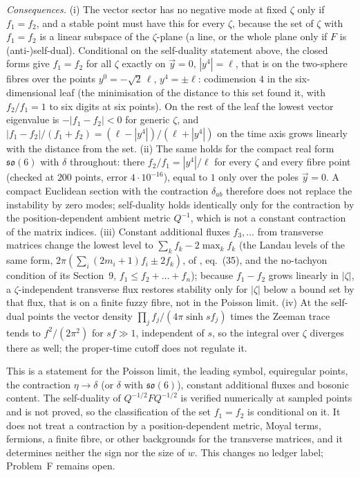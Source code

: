 \emph{Consequences.} (i) The vector sector has no negative mode at fixed \(\zeta\) only if \(f_1=f_2\), and a stable point must have this for every \(\zeta\), because the set of \(\zeta\) with \(f_1=f_2\) is a linear subspace of the \(\zeta\)-plane (a line, or the whole plane only if \(F\) is (anti-)self-dual). Conditional on the self-duality statement above, the closed forms give \(f_1=f_2\) for all \(\zeta\) exactly on \(\vec y=0\), \(|y^4|=\ell\), that is on the two-sphere fibres over the points \(y^0=-\sqrt2\,\ell\), \(y^4=\pm\ell\): codimension \(4\) in the six-dimensional leaf (the minimisation of the distance to this set found it, with \(f_2/f_1=1\) to six digits at six points). On the rest of the leaf the lowest vector eigenvalue is \(-|f_1-f_2|<0\) for generic \(\zeta\), and \(|f_1-f_2|/(f_1+f_2)=(\ell-|y^4|)/(\ell+|y^4|)\) on the time axis grows linearly with the distance from the set. (ii) The same holds for the compact real form \(\mathfrak{so}(6)\) with \(\delta\) throughout: there \(f_2/f_1=|y^4|/\ell\) for every \(\zeta\) and every fibre point (checked at \(200\) points, error \(4\cdot10^{-16}\)), equal to \(1\) only over the poles \(\vec y=0\). A compact Euclidean section with the contraction \(\delta_{ab}\) therefore does not replace the instability by zero modes; self-duality holds identically only for the contraction by the position-dependent ambient metric \(Q^{-1}\), which is not a constant contraction of the matrix indices. (iii) Constant additional fluxes \(f_3,\dots\) from transverse matrices change the lowest level to \(\sum_kf_k-2\max_kf_k\) (the Landau levels of the same form, \(2\pi(\sum_i(2m_i+1)f_i\pm2f_k)\), of \cite{Troost2000}, eq.~(35), and the no-tachyon condition of its Section~9, \(f_1\le f_2+\dots+f_n\)); because \(f_1-f_2\) grows linearly in \(|\zeta|\), a \(\zeta\)-independent transverse flux restores stability only for \(|\zeta|\) below a bound set by that flux, that is on a finite fuzzy fibre, not in the Poisson limit. (iv) At the self-dual points the vector density \(\prod_j f_j/(4\pi\sinh sf_j)\) times the Zeeman trace tends to \(f^2/(2\pi^2)\) for \(sf\gg1\), independent of \(s\), so the integral over \(\zeta\) diverges there as well; the proper-time cutoff does not regulate it.

This is a statement for the Poisson limit, the leading symbol, equiregular points, the contraction \(\eta\to\delta\) (or \(\delta\) with \(\mathfrak{so}(6)\)), constant additional fluxes and bosonic content. The self-duality of \(Q^{-1/2}FQ^{-1/2}\) is verified numerically at sampled points and is not proved, so the classification of the set \(f_1=f_2\) is conditional on it. It does not treat a contraction by a position-dependent metric, Moyal terms, fermions, a finite fibre, or other backgrounds for the transverse matrices, and it determines neither the sign nor the size of \(w\). This changes no ledger label; Problem~F remains open.

